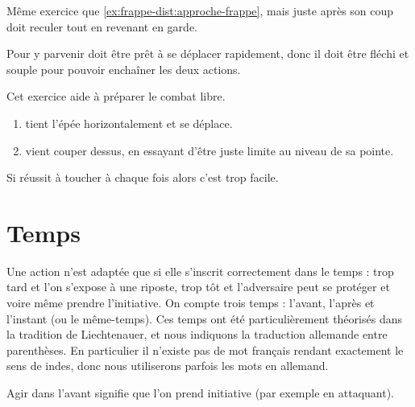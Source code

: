 \begin{exercice}
	\label{ex:frappe-dist:approche-croix-aleat-garde}

	Même exercice que \ref{ex:frappe-dist:approche-frappe}, mais juste après son coup \A doit reculer tout en revenant en garde.

	Pour y parvenir \A doit être prêt à se déplacer rapidement, donc il doit être fléchi et souple pour pouvoir enchaîner les deux actions.

	Cet exercice aide à préparer le combat libre.
\end{exercice}


\begin{exercice}

	\begin{enumerate}
		\item \D tient l'épée horizontalement et se déplace.
		
		\item \A vient couper dessus, en essayant d'être juste limite au niveau de sa pointe.
	\end{enumerate}

	Si \A réussit à toucher à chaque fois alors c'est trop facile.

\end{exercice}


\section{Temps}



Une action n'est adaptée que si elle s'inscrit correctement dans le temps : trop tard et l'on s'expose à une riposte, trop tôt et l'adversaire peut se protéger et voire même prendre l'initiative.
On compte trois temps : l'avant, l'après et l'instant (ou le même-temps).
Ces temps ont été particulièrement théorisés dans la tradition de Liechtenauer, et nous indiquons la traduction allemande entre parenthèses.
En particulier il n'existe pas de mot français rendant exactement le sens de indes, donc nous utiliserons parfois les mots en allemand.


\begin{definition}

	Agir dans l'avant signifie que l'on prend initiative (par exemple en attaquant).
\end{definition}



